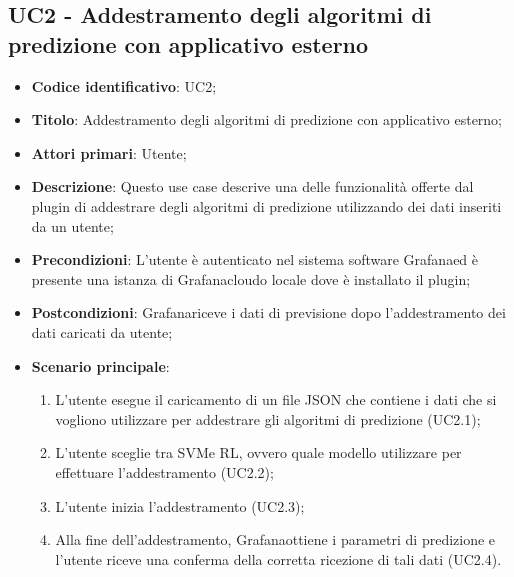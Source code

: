 \subsection{UC2 - Addestramento degli algoritmi di predizione con applicativo esterno}
\begin{itemize}
    \item \textbf{Codice identificativo}: UC2;
    \item \textbf{Titolo}: Addestramento degli algoritmi di predizione con applicativo esterno;
    \item \textbf{Attori primari}: Utente;
    \item \textbf{Descrizione}: Questo use case descrive una delle funzionalità offerte dal plugin di addestrare degli algoritmi di predizione utilizzando dei dati inseriti da un utente;
    \item \textbf{Precondizioni}: L'utente è autenticato nel sistema software Grafana\glosp ed è presente una istanza di Grafana\glosp cloud\glosp o locale dove è installato il plugin;
    \item \textbf{Postcondizioni}: Grafana\glosp riceve i dati di previsione dopo l'addestramento dei dati caricati da utente;
    \item \textbf{Scenario principale}: 
        \begin{enumerate}
            \item L'utente esegue il caricamento di un file JSON che contiene i dati che si vogliono utilizzare per addestrare gli algoritmi di predizione (UC2.1);
            \item L'utente sceglie tra SVM\glosp e RL\glo, ovvero quale modello utilizzare per effettuare l'addestramento (UC2.2);
            \item L'utente inizia l'addestramento (UC2.3);
            \item Alla fine dell'addestramento, Grafana\glosp ottiene i parametri di predizione e l'utente riceve una conferma della corretta ricezione di tali dati (UC2.4).
        \end{enumerate}
\end{itemize}


